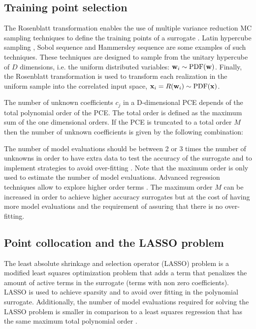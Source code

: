 \documentclass[preprint,12pt]{elsarticle}
\begin{document}

\subsection{Training point selection}

The Rosenblatt transformation enables the use of multiple variance reduction MC sampling techniques to define the training points of a surrogate \cite{feinberg2015chaospy}. Latin hypercube sampling \cite{mckay2000comparison}, Sobol sequence \cite{sobol1967distribution} and Hammersley sequence \cite{hammersley1960monte} are some examples of such techniques. These techniques are designed to sample from the unitary hypercube of $D$ dimensions, i.e. the uniform distributed variables: $\mathbf{w}_i \sim \mathrm{PDF}(\mathbf{w})$. Finally, the Rosenblatt transformation is used to transform each realization in the uniform sample into the correlated input space, $\mathbf{x}_i = R(\mathbf{w}_i) \sim \mathrm{PDF}(\mathbf{x})$.

The number of unknown coefficients $c_j$ in a D-dimensional PCE depends of the total polynomial order of the PCE. The total order is defined as the maximum sum of the one dimensional orders. If the PCE is truncated to a total order $M$ then the number of unknown coefficients is given by the following combination:


The number of model evaluations should be between 2 or 3 times the number of unknowns in order to have extra data to test the accuracy of the surrogate and to implement strategies to avoid over-fitting \cite{blatman2011adaptive}. Note that the maximum order is only used to estimate the number of model evaluations. Advanced regression techniques allow to explore higher order terms \cite{tibshirani1996regression, blatman2011adaptive}. The maximum order $M$ can be increased in order to achieve higher accuracy surrogates but at the cost of having more model evaluations and the requirement of assuring that there is no over-fitting.

\subsection{Point collocation and the LASSO problem}
\label{sec_LASSO}

The least absolute shrinkage and selection operator (LASSO) problem is a modified least squares optimization problem that adds a term that penalizes the amount of active terms in the surrogate (terms with non zero coefficients). LASSO is used to achieve sparsity and to avoid over fitting in the polynomial surrogate. Additionally, the number of model evaluations required for solving the LASSO problem is smaller in comparison to a least squares regression that has the same maximum total polynomial order \cite{blatman2011adaptive}.
\end{document}
